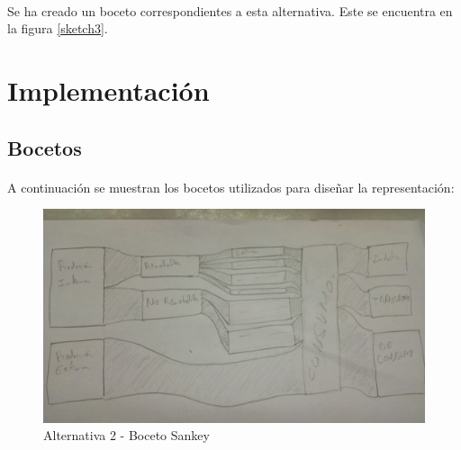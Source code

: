 \documentclass[11pt,spanish]{article}
\begin{document}
			\paragraph{}
			Se ha creado un boceto correspondientes a esta alternativa. Este se encuentra en la figura \ref{sketch3}.

	\section{Implementación}

		\subsection{Bocetos}
		
			\paragraph{}
			A continuación se muestran los bocetos utilizados para diseñar la representación:
		
			\begin{figure}[H]
				\centering
				\includegraphics[width=140mm]{../res/sketch-sankey.jpg}
				\caption{Alternativa 2 - Boceto Sankey \label{sketchSankey}}
			\end{figure}
			
\end{document}
